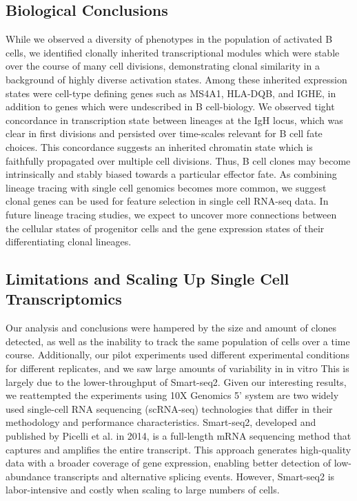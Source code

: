\subsection{Biological Conclusions}
While we observed a diversity of phenotypes in the population of activated B cells, we identified clonally inherited transcriptional modules which were stable over the course of many cell divisions, demonstrating clonal similarity in a background of highly diverse activation states. Among these inherited expression states were cell-type defining genes such as MS4A1, HLA-DQB, and IGHE, in addition to genes which were undescribed in B cell-biology. We observed tight concordance in transcription state between lineages at the IgH locus, which was clear in first divisions and persisted over time-scales relevant for B cell fate choices\cite{hodgkin_modifying_2018}. This concordance suggests an inherited chromatin state which is faithfully propagated over multiple cell divisions. Thus, B cell clones may become intrinsically and stably biased towards a particular effector fate. As combining lineage tracing with single cell genomics becomes more common, we suggest clonal genes can be used for feature selection in single cell RNA-seq data. In future lineage tracing studies, we expect to uncover more connections between the cellular states of progenitor cells and the gene expression states of their differentiating clonal lineages.

\subsection{Limitations and Scaling Up Single Cell Transcriptomics}
Our analysis and conclusions were hampered by the size and amount of clones detected, as well as the inability to track the same population of cells over a time course. Additionally, our pilot experiments used different experimental conditions for different replicates, and we saw large amounts of variability in in vitro This is largely due to the lower-throughput of Smart-seq2\cite{baran2018experimental}. Given our interesting results, we reattempted the experiments using   10X Genomics 5' system are two widely used single-cell RNA sequencing (scRNA-seq) technologies that differ in their methodology and performance characteristics. Smart-seq2, developed and published by Picelli et al. in 2014\cite{picelli2014full}, is a full-length mRNA sequencing method that captures and amplifies the entire transcript. This approach generates high-quality data with a broader coverage of gene expression, enabling better detection of low-abundance transcripts and alternative splicing events. However, Smart-seq2 is labor-intensive and costly when scaling to large numbers of cells.

